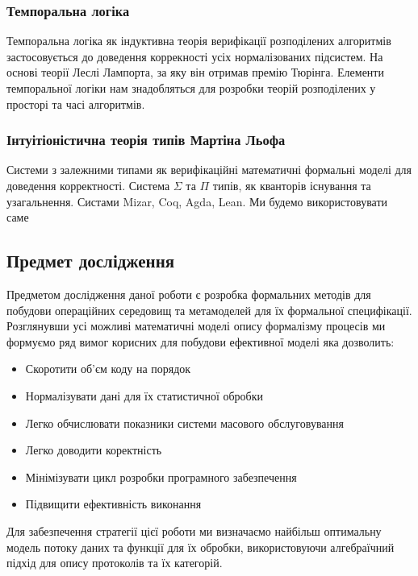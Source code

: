 \documentclass[11pt,oneside]{article}
\begin{document}
   \subsubsection*{Темпоральна логіка}
   Темпоральна логіка як індуктивна теорія верифікації розподілених алгоритмів
   застосовується до доведення коррекності усіх нормалізованих підсистем. На основі
   теорії  Леслі Лампорта\cite{tla}, за яку він отримав премію Тюрінга.
   Елементи темпоральної логіки нам знадобляться для розробки теорій
   розподілених у просторі та часі алгоритмів.\\

   \subsubsection*{Інтуітіоністична теорія типів Мартіна Льофа}
   Системи з залежними типами як верифікаційні математичні формальні моделі
   для доведення корректності. Система $\Sigma$ та $\Pi$ типів, як кванторів
   існування та узагальнення. Систами Mizar, Coq, Agda, Lean. Ми будемо
   використовувати саме

\newpage
\subsection{Предмет дослідження}
\vspace{0.5cm}

   Предметом дослідження даної роботи є розробка формальних методів для побудови
   операційних середовищ та метамоделей для їх формальної специфікації. Розглянувши усі
   можливі математичні моделі опису формалізму процесів ми формуємо ряд вимог корисних
   для побудови ефективної моделі яка дозволить:

\begin{itemize}
   \item Скоротити об’єм коду на порядок
   \item Нормалізувати дані для їх статистичної обробки
   \item Легко обчислювати показники системи масового обслуговування
   \item Легко доводити коректність
   \item Мінімізувати цикл розробки програмного забезпечення
   \item Підвищити ефективність виконання
\end{itemize}

  Для забезпечення стратегії цієї роботи ми визначаємо найбільш оптимальну модель
  потоку даних та функції для їх обробки, використовуючи алгебраїчний підхід
  для опису протоколів та їх категорій.
\end{document}
